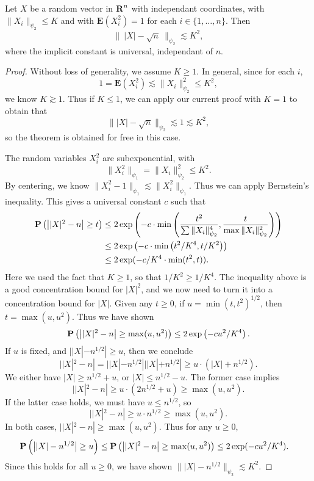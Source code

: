 \begin{theorem} \label{concentrationNorm}
    Let $X$ be a random vector in $\operatorname{\mathbf{R}}^n$ with independant coordinates, with $\| X_i \|_{\psi_2} \leq K$ and with $\mathbf{E}(X_i^2) = 1$ for each $i \in \{ 1, \dots, n \}$. Then
    \[ \|\ |X| - \sqrt{n}\ \|_{\psi_2} \lesssim K^2, \]
    where the implicit constant is universal, independant of $n$.
\end{theorem}
\begin{proof}
	Without loss of generality, we assume $K \geq 1$. In general, since for each $i$,
    \[ 1 = \mathbf{E}(X_i^2) \lesssim \| X_i \|_{\psi_2}^2 \leq K^2, \]
    we know $K \gtrsim 1$. Thus if $K \leq 1$, we can apply our current proof with $K = 1$ to obtain that
    \[ \| |X| - \sqrt{n} \|_{\psi_2} \lesssim 1 \lesssim K^2, \]
    so the theorem is obtained for free in this case.

    The random variables $X_i^2$ are subexponential, with
    \[ \| X_i^2 \|_{\psi_1} = \| X_i \|_{\psi_2}^2 \leq K^2. \]
    By centering, we know $\| X_i^2 - 1 \|_{\psi_1} \lesssim \| X_i^2 \|_{\psi_1}$. Thus we can apply Bernstein's inequality. This gives a universal constant $c$ such that
    \begin{align*}
        \operatorname{\mathbf{P}} \left( \big||X|^2 - n \big| \geq t \right) &\leq 2 \exp \left( -c \cdot \min \left( \frac{t^2}{\sum \| X_i \|_{\psi_2}^4}, \frac{t}{\max \| X_i \|_{\psi_2}^2} \right) \right)\\
        &\leq 2 \exp \left( -c \cdot \min \left( t^2 / K^4 , t/K^2 \right) \right)\\
        &\leq 2 \exp(- c/K^4 \cdot \min(t^2,t)).
    \end{align*}
    Here we used the fact that $K \geq 1$, so that $1/K^2 \geq 1/K^4$. The inequality above is a good concentration bound for $|X|^2$, and we now need to turn it into a concentration bound for $|X|$. Given any $t \geq 0$, if $u = \min(t,t^2)^{1/2}$, then $t = \max(u,u^2)$. Thus we have shown
    \[ \operatorname{\mathbf{P}} \left( \big||X|^2 - n \big| \geq \max(u,u^2) \right) \leq 2 \exp \left( - cu^2/K^4 \right). \]
    If $u$ is fixed, and $||X| - n^{1/2}| \geq u$, then we conclude
    \[ ||X|^2 - n| = ||X| - n^{1/2}|||X| + n^{1/2}| \geq u \cdot (|X| + n^{1/2}). \]
    We either have $|X| \geq n^{1/2} + u$, or $|X| \leq n^{1/2} - u$. The former case implies
    \[ ||X|^2 - n| \geq u \cdot (2n^{1/2} + u) \geq \max(u,u^2). \]
    If the latter case holds, we must have $u \leq n^{1/2}$, so
    \[ ||X|^2 - n| \geq u \cdot n^{1/2} \geq \max(u,u^2). \]
    In both cases, $||X|^2 - n| \geq \max(u,u^2)$. Thus for any $u \geq 0$,
    \begin{align*}
        \operatorname{\mathbf{P}} \left( \big| |X| - n^{1/2} \big| \geq u \right) &\leq \operatorname{\mathbf{P}} \left( \big| |X|^2 - n \big| \geq \max(u,u^2) \right) \leq 2 \exp(-cu^2/K^4).
    \end{align*}
    Since this holds for all $u \geq 0$, we have shown $\| |X| - n^{1/2} \|_{\psi_2} \lesssim K^2$.
\end{proof}

